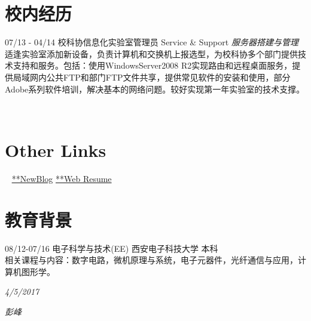 \documentclass[]{friggeri-cv}
\begin{document}
\newpage


\section{校内经历}
\begin{entrylist}
  \entry
    {07/13 - 04/14}
    {校科协信息化实验室管理员}
    {Service \& Support}
    {\emph{服务器搭建与管理}
    适逢实验室添加新设备，负责计算机和交换机上报选型，为校科协多个部门提供技术支持和服务。包括：使用WindowsServer2008 R2实现路由和远程桌面服务，提供局域网内公共FTP和部门FTP文件共享，提供常见软件的安装和使用，部分Adobe系列软件培训，解决基本的网络问题。较好实现第一年实验室的技术支撑。  \\     
    }
    
\end{entrylist}






\begin{aside}
~
~ 
  ~    
  \section{Other Links}
    ~
    {\href{https://blog.mxuan.me}{**NewBlog}}
    {\href{https://resume.mxuan.me}{**Web Resume}}
   ~
   ~
\end{aside}




\section{教育背景}
08/12\hspace{1mm}-\hspace{1mm}07/16 \hspace{27mm} 电子科学与技术(EE) \hspace{7mm}  西安电子科技大学  \hspace{7mm}  本科 \\

相关课程与内容：数字电路，微机原理与系统，电子元器件，光纤通信与应用，计算机图形学。\\

\begin{flushleft}

\emph{4/5/2017}
\end{flushleft}
\begin{flushright}
\emph{彭峰}
\end{flushright}
\end{document}
